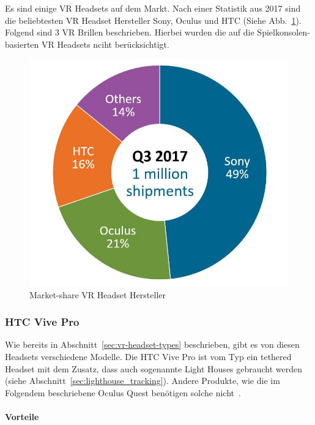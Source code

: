 Es sind einige VR Headsets auf dem Markt.
Nach einer Statistik aus 2017 sind die beliebtesten VR Headset Hersteller Sony, Oculus und HTC (Siehe Abb.~\ref{fig:vr_headset_manufacturer_marketshare}).
Folgend sind 3 VR Brillen beschrieben.
Hierbei wurden die auf die Spielkonsolen-basierten VR Headsets nciht berücksichtigt.

\begin{figure}
    \centering
    \includegraphics[scale=0.25]{pics/vr_headset_manufacturer_marketshare}
    \caption{Market-share VR Headset Hersteller~\cite{MARTINDALE_2017}}
    \label{fig:vr_headset_manufacturer_marketshare}
\end{figure}

\subsubsection{HTC Vive Pro}\label{sec:htc-vive}

Wie bereits in Abschnitt~\ref{sec:vr-headset-types} beschrieben, gibt es von diesen Headsets verschiedene Modelle.
Die HTC Vive Pro ist vom Typ ein tethered Headset mit dem Zusatz, dass auch sogenannte Light Houses gebraucht werden (siehe Abschnitt~\ref{sec:lighthouse_tracking}).
Andere Produkte, wie die im Folgendem beschriebene Oculus Quest benötigen solche nicht~\cite{MECHATECH}.

\paragraph{Vorteile}

